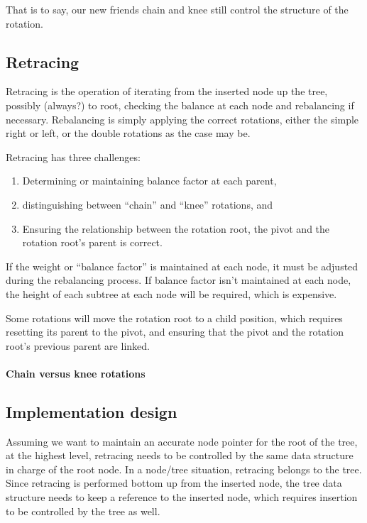 \documentclass{article}
\begin{document}
That is to say, our new friends chain and knee still control the structure
of the rotation.


\subsection{Retracing}

Retracing is the operation of iterating from the inserted
node up the tree, possibly (always?) to root, checking
the balance at each node and rebalancing if necessary.
Rebalancing is simply applying the correct rotations,
either the simple right or left, or the double rotations
as the case may be.

Retracing has three challenges:

\begin{enumerate}
  \item Determining or maintaining balance factor at each parent,
  \item distinguishing between ``chain'' and ``knee'' rotations, and
  \item Ensuring the relationship between the rotation root, the pivot
    and the rotation root's parent is correct.
\end{enumerate}

If the weight or ``balance factor'' is maintained at each node, it must be
adjusted during the rebalancing process. If balance factor isn't maintained at
each node, the height of each subtree at each node will be required, which is
expensive.

Some rotations will move the rotation root to a child position, which
requires resetting its parent to the pivot, and ensuring that the
pivot and the rotation root's previous parent are linked.

\paragraph{Chain versus knee rotations}

\subsection{Implementation design}

Assuming we want to maintain an accurate node pointer for the root of the tree,
at the highest level, retracing needs to be controlled by the same data
structure in charge of the root node. In a node/tree situation, retracing
belongs to the tree. Since retracing is performed bottom up from the
inserted node, the tree data structure needs to keep a reference to
the inserted node, which requires insertion to be controlled by the
tree as well.
\end{document}
